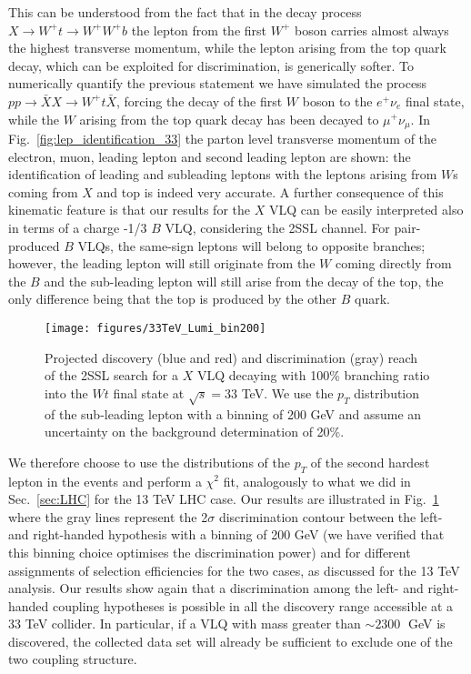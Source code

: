 \documentclass[a4paper]{article}
\begin{document}
This can be understood from the fact that in the decay process $X\to W^+ t \to W^+ W^+ b$ the lepton from the first $W^+$ boson carries almost always the highest transverse momentum, while the lepton arising from the top quark decay, which can be exploited for discrimination, is generically softer. To numerically quantify the previous statement we have simulated the process $p p \to  \bar{X}  X\to W^+ t \bar{X}$, forcing the decay of the first $W$ boson to the $e^+ \nu_e$ final state, while the $W$ arising from the top quark decay has been decayed to $\mu^+ \nu_\mu$. In Fig.~\ref{fig:lep_identification_33} the parton level transverse momentum of the electron, muon, leading lepton and second leading lepton are shown: the identification of leading and subleading leptons with the leptons arising from $W$s coming from $X$ and top is indeed very accurate. A further consequence of this kinematic feature is that our results for the $X$ VLQ can be easily interpreted also in terms of a charge -1/3 $B$ VLQ, considering the 2SSL channel. For pair-produced $B$ VLQs, the same-sign leptons will belong to opposite branches; however, the leading lepton will still originate from the $W$ coming directly from the $B$ and the sub-leading lepton will still arise from the decay of the top, the only difference being that the top is produced by the other $B$ quark.



\begin{figure}[!htbp]
\centering
\texttt{[image: figures/33TeV\_Lumi\_bin200]}
\caption{\label{fig:33Lumi_2} Projected discovery (blue and red) and discrimination (gray)  reach of the 2SSL search for a $X$ VLQ decaying with 100\% branching ratio into the $Wt$ final state at $\sqrt{s}=33$ TeV. We use the $p_T$ distribution of the sub-leading lepton with a binning of 200 GeV and assume an uncertainty on the background determination of 20\%.}
\end{figure}



We therefore choose to use the distributions of the $p_T$ of the second hardest lepton in the events and perform a $\chi^2$ fit, analogously to what we did in Sec.~\ref{sec:LHC} for the 13 TeV LHC case. Our results are illustrated in Fig.~\ref{fig:33Lumi_2} where the gray lines represent the 2$\sigma$ discrimination contour between the left- and right-handed hypothesis with a binning of 200 GeV (we have verified that this binning choice optimises the discrimination power) and for different assignments of selection efficiencies for the two cases, as discussed for the 13 TeV analysis. Our results show again that a discrimination among the left- and right-handed coupling hypotheses is possible in all the discovery range accessible at a 33 TeV collider. In particular, if a VLQ with mass greater than $\sim 2300\;$ GeV is discovered, the collected data set will already be sufficient to exclude one of the two coupling structure. 
\end{document}
